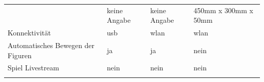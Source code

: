 \begin{longtable}[]{@{}llll@{}}
\begin{minipage}[t]{0.20\columnwidth}
\end{minipage} & \begin{minipage}[t]{0.24\columnwidth}\raggedright
keine Angabe\strut
\end{minipage} & \begin{minipage}[t]{0.26\columnwidth}\raggedright
keine Angabe\strut
\end{minipage} & \begin{minipage}[t]{0.19\columnwidth}\raggedright
450mm x 300mm x 50mm\strut
\end{minipage}\tabularnewline
\begin{minipage}[t]{0.20\columnwidth}\raggedright
Konnektivität\strut
\end{minipage} & \begin{minipage}[t]{0.24\columnwidth}\raggedright
\gls{usb}\strut
\end{minipage} & \begin{minipage}[t]{0.26\columnwidth}\raggedright
\gls{wlan}\strut
\end{minipage} & \begin{minipage}[t]{0.19\columnwidth}\raggedright
\gls{wlan}\strut
\end{minipage}\tabularnewline
\begin{minipage}[t]{0.20\columnwidth}\raggedright
Automatisches Bewegen der Figuren\strut
\end{minipage} & \begin{minipage}[t]{0.24\columnwidth}\raggedright
ja\strut
\end{minipage} & \begin{minipage}[t]{0.26\columnwidth}\raggedright
ja\strut
\end{minipage} & \begin{minipage}[t]{0.19\columnwidth}\raggedright
nein\strut
\end{minipage}\tabularnewline
\begin{minipage}[t]{0.20\columnwidth}\raggedright
Spiel Livestream\strut
\end{minipage} & \begin{minipage}[t]{0.24\columnwidth}\raggedright
nein\strut
\end{minipage} & \begin{minipage}[t]{0.26\columnwidth}\raggedright
nein\strut
\end{minipage} & \begin{minipage}[t]{0.19\columnwidth}\raggedright
nein\strut
\end{minipage}\tabularnewline
\begin{minipage}[t]{0.20\columnwidth}\raggedright

\end{minipage}
\end{longtable}
